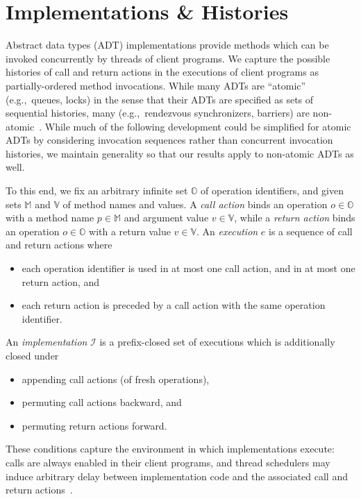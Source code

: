 \section{Implementations \& Histories}
\label{sec:histories}

Abstract data types (ADT) implementations provide methods which can be invoked
concurrently by threads of client programs. We capture the possible histories of
call and return actions in the executions of client programs as
partially-ordered method invocations. While many ADTs are “atomic”
(e.g.,~queues, locks) in the sense that their ADTs are specified as sets of
sequential histories, many (e.g.,~rendezvous synchronizers, barriers) are
non-atomic~\cite{conf/podc/HemedR14}. While much of the following development
could be simplified for atomic ADTs by considering invocation sequences rather
than concurrent invocation histories, we maintain generality so that our results
apply to non-atomic ADTs as well.

To this end, we fix an arbitrary infinite set $\mathbb{O}$ of operation
identifiers, and given sets $\mathbb{M}$ and $\mathbb{V}$ of method names and
values. A \emph{call action} binds an operation $o \in \mathbb{O}$ with a
method name $p \in \mathbb{M}$ and argument value $v \in \mathbb{V}$, while a
\emph{return action} binds an operation $o \in \mathbb{O}$ with a return value
$v \in \mathbb{V}$. An \emph{execution} $e$ is a sequence of call and return
actions where
\begin{itemize}

  \item each operation identifier is used in at most one call action, and in at
  most one return action, and

  \item each return action is preceded by a call action with the same operation
  identifier.

\end{itemize}
An \emph{implementation} $\mathcal{I}$ is a prefix-closed set of executions
which is additionally closed under
\begin{itemize}

  \item appending call actions (of fresh operations),

  \item permuting call actions backward, and

  \item permuting return actions forward.

\end{itemize}
These conditions capture the environment in which implementations execute:
calls are always enabled in their client programs, and thread schedulers may
induce arbitrary delay between implementation code and the associated call and
return actions~\cite{conf/popl/BouajjaniEEH15}.

